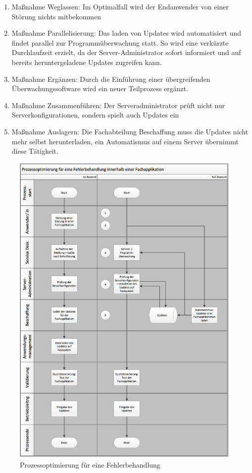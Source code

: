 \documentclass[a4paper, 12pt]{scrreprt}
\begin{document}
\begin{enumerate}
    \item Maßnahme Weglassen: Im Optimalfall wird der Endanwender von einer Störung nichts mitbekommen
    \item Maßnahme Parallelisierung: Das laden von Updates wird automatisiert und findet parallel zur Programmüberwachung statt. So wird eine verkürzte Durchlaufzeit erzielt, da der Server-Administrator sofort informiert und auf bereits heruntergeladene Updates zugreifen kann.
    \item Maßnahme Ergänzen: Durch die Einführung einer übergreifenden Überwachungssoftware wird ein neuer Teilprozess ergänzt.
    \item Maßnahme Zusammenführen: Der Serveradministrator prüft nicht nur Serverkonfigurationen, sondern spielt auch Updates ein
    \item Maßnahme Auslagern: Die Fachabteilung Beschaffung muss die Updates nicht mehr selbst herunterladen, ein Automatismus auf einem Server übernimmt diese Tätigkeit.
\end{enumerate}


\begin{figure}[h!]
	\centering
	\includegraphics[width=16cm]{bilder_olli/prozessoptimierung} 
	\caption{Prozessoptimierung für eine Fehlerbehandlung}
	\label{pfef}
\end{figure}
\end{document}
